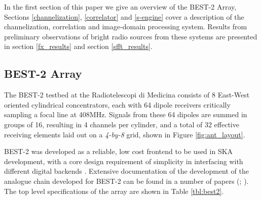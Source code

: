 \documentclass[useAMS,macros,usenatbib]{mn2e}
\begin{document}
In the first section of this paper we give an overview of the BEST-2 Array, Sections \ref{channelization}, \ref{correlator} and \ref{s-engine} cover a description of the channelization, correlation and image-domain processing system.
Results from preliminary observations of bright radio sources from these systems are presented in section \ref{fx_results} and section \ref{sfft_results}.

\subsection{BEST-2 Array}
\label{best-2 array}

The BEST-2 testbed at the Radiotelescopi di Medicina consists of 8 East-West oriented cylindrical concentrators, each with 64 dipole receivers critically sampling a focal line at 408MHz.
Signals from these 64 dipoles are summed in groups of 16, resulting in 4 channels per cylinder, and a total of 32 effective receiving elements laid out on a \emph{4-by-8} grid, shown in Figure \ref{fig:ant_layout}.

BEST-2 was developed as a reliable, low cost frontend to be used in SKA development, with a core design requirement of simplicity in interfacing with different digital backends \citep{best2}.
Extensive documentation of the development of the analogue chain developed for BEST-2 can be found in a number of papers (\cite{best2-lna}; \cite{best2-rec}). The top level specifications of the array are shown in Table \ref{tbl:best2}.

\end{document}
